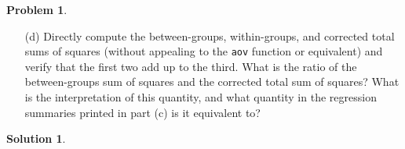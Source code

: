 \documentclass[11pt,letterpaper,english,oneside]{article} %
\theoremstyle{definition} %
\newtheorem{problem}{Problem}
\newtheorem{solution}{Solution}
\newenvironment{prob}{\clearpage \begin{problem}\hspace{0pt}}{\end{problem}}
\newenvironment{sol}{\begin{solution}\hspace{0pt}}{\end{solution}}
\begin{document}
\begin{prob}
\begin{enumerate}
\item[(d)] Directly compute the between-groups, within-groups, and corrected total sums of squares (without appealing to the \texttt{aov} function or equivalent) and verify that the first two add up to the third. What is the  ratio of the between-groups sum of squares and the corrected total sum of squares? What is the interpretation of this quantity, and what quantity in the regression summaries printed in part (c) is it equivalent to?

\end{enumerate}

\end{prob}

\begin{sol}
\end{sol}
\end{document}
